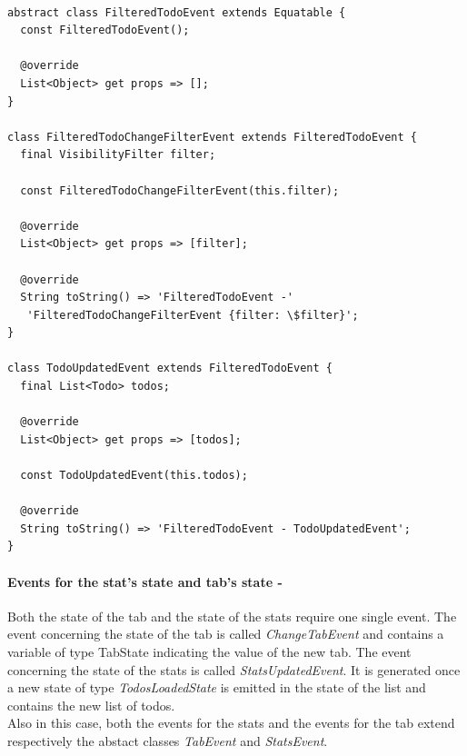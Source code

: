 \begin{code}
\mbox{}
 \mbox{}
\label{code:2.84}
\begin{verbatim}

abstract class FilteredTodoEvent extends Equatable {
  const FilteredTodoEvent();

  @override
  List<Object> get props => [];
}

class FilteredTodoChangeFilterEvent extends FilteredTodoEvent {
  final VisibilityFilter filter;

  const FilteredTodoChangeFilterEvent(this.filter);

  @override
  List<Object> get props => [filter];

  @override
  String toString() => 'FilteredTodoEvent -'
   'FilteredTodoChangeFilterEvent {filter: \$filter}';
}

class TodoUpdatedEvent extends FilteredTodoEvent {
  final List<Todo> todos;

  @override
  List<Object> get props => [todos];

  const TodoUpdatedEvent(this.todos);

  @override
  String toString() => 'FilteredTodoEvent - TodoUpdatedEvent';
}
\end{verbatim}
\mbox{}
\end{code}


\paragraph{Events for the stat’s state and tab’s state - }
\label{subpar:todo_app_bloc_core_state}

Both the state of the tab and the state of the stats require one single event. The event concerning the state of the tab is called \textit{ChangeTabEvent} and contains  a variable of type TabState indicating the value of the new tab. The event concerning the state of the stats is called \textit{StatsUpdatedEvent}. It is generated once a new state of type \textit{TodosLoadedState} is emitted in the state of the list and contains the new list of todos. \\
Also in this case,  both the events for the stats and the events for the tab extend respectively the abstact classes \textit{TabEvent} and \textit{StatsEvent}.

